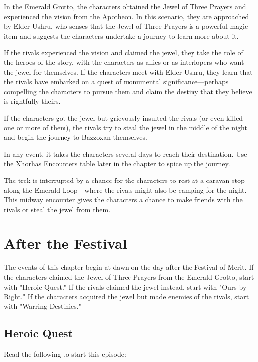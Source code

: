 \documentclass[10pt,a4paper,twoside,bg=print,twocolumn,openany,nodeprecatedcode]{dndbook}
\begin{document}
\begin{description}[nolistsep]
\item[Heroic Quest.]
In the Emerald Grotto, the characters obtained the Jewel of Three Prayers and experienced the vision from the Apotheon. In this scenario, they are approached by Elder Ushru, who senses that the Jewel of Three Prayers is a powerful magic item and suggests the characters undertake a journey to learn more about it.
\item[Ours by Right.]
If the rivals experienced the vision and claimed the jewel, they take the role of the heroes of the story, with the characters as allies or as interlopers who want the jewel for themselves. If the characters meet with Elder Ushru, they learn that the rivals have embarked on a quest of monumental significance—perhaps compelling the characters to pursue them and claim the destiny that they believe is rightfully theirs.
\item[Warring Destinies.]
If the characters got the jewel but grievously insulted the rivals (or even killed one or more of them), the rivals try to steal the jewel in the middle of the night and begin the journey to Bazzoxan themselves.
\end{description}

In any event, it takes the characters several days to reach their destination. Use the Xhorhas Encounters table later in the chapter to spice up the journey.

The trek is interrupted by a chance for the characters to rest at a caravan stop along the Emerald Loop—where the rivals might also be camping for the night. This midway encounter gives the characters a chance to make friends with the rivals or steal the jewel from them.

\section{After the Festival}
The events of this chapter begin at dawn on the day after the Festival of Merit. If the characters claimed the Jewel of Three Prayers from the Emerald Grotto, start with "Heroic Quest." If the rivals claimed the jewel instead, start with "Ours by Right." If the characters acquired the jewel but made enemies of the rivals, start with "Warring Destinies."

\subsection{Heroic Quest}
Read the following to start this episode:
\end{document}
